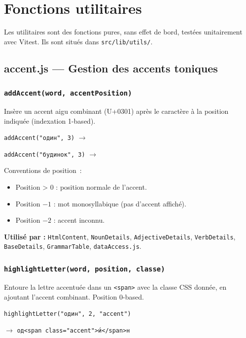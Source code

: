 \section{Fonctions utilitaires}

Les utilitaires sont des fonctions pures, sans effet de bord, testées unitairement avec Vitest. Ils sont situés dans \texttt{src/lib/utils/}.

\subsection{accent.js --- Gestion des accents toniques}

\subsubsection{\texttt{addAccent(word, accentPosition)}}

Insère un accent aigu combinant (U+0301) après le caractère à la position indiquée (indexation 1-based).

\begin{ukrbox}
\texttt{addAccent("один", 3)} $\rightarrow$ 

\texttt{addAccent("будинок", 3)} $\rightarrow$ 
\end{ukrbox}

Conventions de position~:
\begin{itemize}
  \item Position > 0 : position normale de l'accent.
  \item Position $-1$ : mot monosyllabique (pas d'accent affiché).
  \item Position $-2$ : accent inconnu.
\end{itemize}

\textbf{Utilisé par :} \texttt{HtmlContent}, \texttt{NounDetails}, \texttt{AdjectiveDetails}, \texttt{VerbDetails}, \texttt{BaseDetails}, \texttt{GrammarTable}, \texttt{dataAccess.js}.

\subsubsection{\texttt{highlightLetter(word, position, classe)}}

Entoure la lettre accentuée dans un \texttt{<span>} avec la classe CSS donnée, en ajoutant l'accent combinant. Position 0-based.

\begin{ukrbox}
\texttt{highlightLetter("один", 2, "accent")}

$\rightarrow$ \texttt{од<span class="accent">и́</span>н}
\end{ukrbox}

